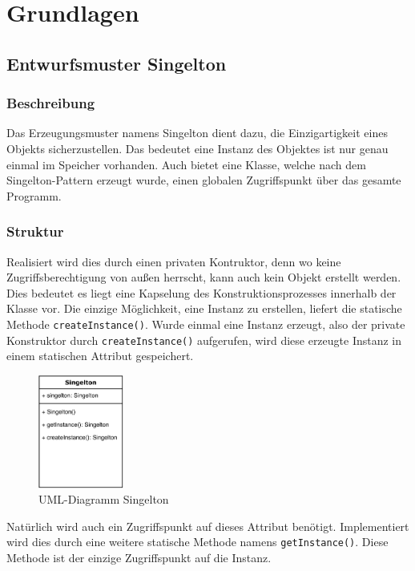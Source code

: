 \section{Grundlagen}\label{sec:grundlagen}
\subsection{Entwurfsmuster Singelton}\label{subsec:entwurdsmuster-singelton}
\subsubsection{Beschreibung}
Das Erzeugungsmuster namens Singelton dient dazu, die Einzigartigkeit eines Objekts sicherzustellen.
Das bedeutet eine Instanz des Objektes ist nur genau einmal im Speicher vorhanden.
Auch bietet eine Klasse, welche nach dem Singelton-Pattern erzeugt wurde, einen globalen Zugriffspunkt über das gesamte Programm.
\subsubsection{Struktur}
Realisiert wird dies durch einen privaten Kontruktor, denn wo keine Zugriffsberechtigung von außen herrscht, kann auch kein Objekt erstellt werden.
Dies bedeutet es liegt eine Kapselung des Konstruktionsprozesses innerhalb der Klasse vor.
Die einzige Möglichkeit, eine Instanz zu erstellen, liefert die statische Methode \lstinline{createInstance()}.
Wurde einmal eine Instanz erzeugt, also der private Konstruktor durch \lstinline{createInstance()} aufgerufen, wird diese erzeugte Instanz in einem statischen Attribut gespeichert.\\
\begin{figure}[H]
    \centering
    \includegraphics[width=0.25\textwidth]{fig/ainf/Singelton.pdf}
    \caption{UML-Diagramm Singelton}
\end{figure}
Natürlich wird auch ein Zugriffspunkt auf dieses Attribut benötigt.
Implementiert wird dies durch eine weitere statische Methode namens \lstinline{getInstance()}.
Diese Methode ist der einzige Zugriffspunkt auf die Instanz.
